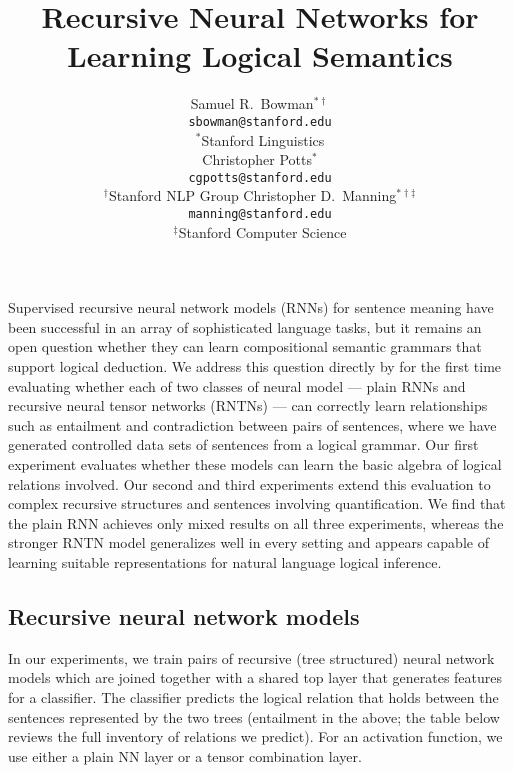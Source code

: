 \documentclass{article} %
\title{Recursive Neural Networks for Learning Logical Semantics}
\author{
Samuel R.\ Bowman$^{\ast\dag}$ \\
\texttt{sbowman@stanford.edu} \\[2ex]
$^{\ast}$Stanford Linguistics \\
\And
Christopher Potts$^{\ast}$\\
\texttt{cgpotts@stanford.edu} \\[2ex]
$^{\dag}$Stanford NLP Group
\And
Christopher D.\ Manning$^{\ast\dag\ddag}$\\
\texttt{manning@stanford.edu}\\[2ex]
$^{\ddag}$Stanford Computer Science
}
\def\ii#1{\textit{#1}}
\begin{document}
\maketitle


  Supervised recursive neural network models (RNNs) for sentence
  meaning have been successful in an array of sophisticated language
  tasks, but it remains an open question whether they can learn
  compositional semantic grammars that support logical deduction.  We
  address this question directly by for the first time evaluating
  whether each of two classes of neural model --- plain RNNs and
  recursive neural tensor networks (RNTNs) --- can correctly learn
  relationships such as entailment and contradiction between pairs of
  sentences, where we have generated controlled data sets of sentences
  from a logical grammar.  Our first experiment evaluates whether
  these models can learn the basic algebra of logical relations
  involved. Our second and third experiments extend this evaluation to
  complex recursive structures and sentences involving quantification.
  We find that the plain RNN achieves only mixed results on all three
  experiments, whereas the stronger RNTN model generalizes well in
  every setting and appears capable of learning suitable
  representations for natural language logical inference.

\subsection*{Recursive neural network models}

\begin{figure}[hp]
  \centering\resizebox{4.5in}{!}{
  }
  \label{sample-figure}
\end{figure}

In our experiments, we train pairs of recursive (tree structured) neural network models \cite{socher2013acl1} which are joined together with a shared top layer that generates features for a classifier. The classifier predicts the logical relation that holds between the sentences represented by the two trees (entailment in the above; the table below reviews the full inventory of relations we predict). For an activation function, we use either a plain NN layer or a tensor combination layer.
\end{document}
